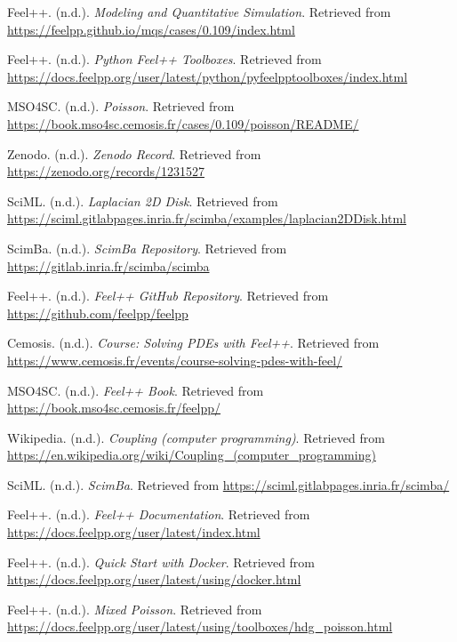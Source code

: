 \documentclass[12pt]{article}
\begin{document}
\begin{thebibliography}{14}

Feel++. (n.d.). \textit{Modeling and Quantitative Simulation}. Retrieved from \url{https://feelpp.github.io/mqs/cases/0.109/index.html}

Feel++. (n.d.). \textit{Python Feel++ Toolboxes}. Retrieved from \url{https://docs.feelpp.org/user/latest/python/pyfeelpptoolboxes/index.html}

MSO4SC. (n.d.). \textit{Poisson}. Retrieved from \url{https://book.mso4sc.cemosis.fr/cases/0.109/poisson/README/}

Zenodo. (n.d.). \textit{Zenodo Record}. Retrieved from \url{https://zenodo.org/records/1231527}


SciML. (n.d.). \textit{Laplacian 2D Disk}. Retrieved from \url{https://sciml.gitlabpages.inria.fr/scimba/examples/laplacian2DDisk.html}

ScimBa. (n.d.). \textit{ScimBa Repository}. Retrieved from \url{https://gitlab.inria.fr/scimba/scimba}

Feel++. (n.d.). \textit{Feel++ GitHub Repository}. Retrieved from \url{https://github.com/feelpp/feelpp}

Cemosis. (n.d.). \textit{Course: Solving PDEs with Feel++}. Retrieved from \url{https://www.cemosis.fr/events/course-solving-pdes-with-feel/}

MSO4SC. (n.d.). \textit{Feel++ Book}. Retrieved from \url{https://book.mso4sc.cemosis.fr/feelpp/}

Wikipedia. (n.d.). \textit{Coupling (computer programming)}. Retrieved from \url{https://en.wikipedia.org/wiki/Coupling_(computer_programming)}

SciML. (n.d.). \textit{ScimBa}. Retrieved from \url{https://sciml.gitlabpages.inria.fr/scimba/}

Feel++. (n.d.). \textit{Feel++ Documentation}. Retrieved from \url{https://docs.feelpp.org/user/latest/index.html}

Feel++. (n.d.). \textit{Quick Start with Docker}. Retrieved from \url{https://docs.feelpp.org/user/latest/using/docker.html}

Feel++. (n.d.). \textit{Mixed Poisson}. Retrieved from \url{https://docs.feelpp.org/user/latest/using/toolboxes/hdg_poisson.html}

\end{thebibliography}
\end{document}
